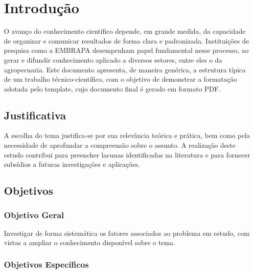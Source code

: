 \chapter{Introdução}
\label{cap:introducao}


O avanço do conhecimento científico depende, em grande medida, da capacidade de organizar e comunicar resultados de forma clara e padronizada. Instituições de pesquisa como a \gls{EMBRAPA} desempenham papel fundamental nesse processo, ao gerar e difundir conhecimento aplicado a diversos setores, entre eles o da \gls{agropecuaria}. Este documento apresenta, de maneira genérica, a estrutura típica de um trabalho técnico-científico, com o objetivo de demonstrar a formatação adotada pelo template, cujo documento final é gerado em formato \gls{PDF}.

\section{Justificativa}
\label{sec:justificativa}


A escolha do tema justifica-se por sua relevância teórica e prática, bem como pela necessidade de aprofundar a compreensão sobre o assunto. A realização deste estudo contribui para preencher lacunas identificadas na literatura e para fornecer subsídios a futuras investigações e aplicações.

\section{Objetivos}
\label{sec:objetivos}


\subsection{Objetivo Geral}
\label{sec:objetivo-geral}

Investigar de forma sistemática os fatores associados ao problema em estudo, com vistas a ampliar o conhecimento disponível sobre o tema.

\subsection{Objetivos Específicos}
\label{sec:objetivos-especificos}

